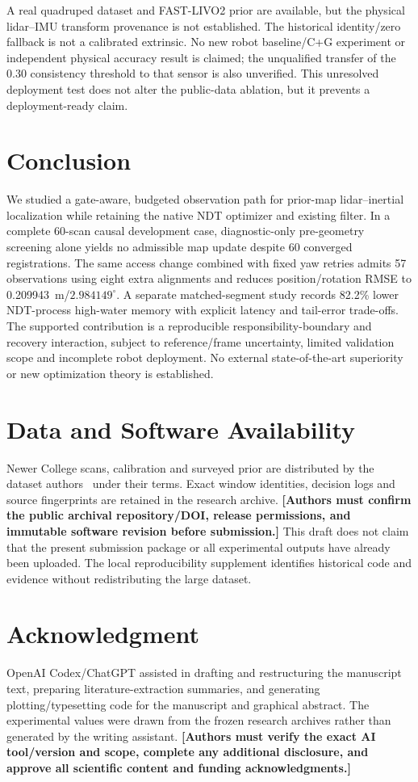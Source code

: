 \documentclass[journal,10pt,letterpaper]{IEEEtran}
\newcommand{\placeholder}[1]{\textbf{[#1]}}
\begin{document}
A real quadruped dataset and FAST-LIVO2 prior are available, but the physical lidar--IMU transform provenance is not established. The historical identity/zero fallback is not a calibrated extrinsic. No new robot baseline/C+G experiment or independent physical accuracy result is claimed; the unqualified transfer of the 0.30 consistency threshold to that sensor is also unverified. This unresolved deployment test does not alter the public-data ablation, but it prevents a deployment-ready claim.

\section{Conclusion}
We studied a gate-aware, budgeted observation path for prior-map lidar--inertial localization while retaining the native NDT optimizer and existing filter. In a complete 60-scan causal development case, diagnostic-only pre-geometry screening alone yields no admissible map update despite 60 converged registrations. The same access change combined with fixed yaw retries admits 57 observations using eight extra alignments and reduces position/rotation RMSE to 0.209943~m/$2.984149^\circ$. A separate matched-segment study records 82.2\% lower NDT-process high-water memory with explicit latency and tail-error trade-offs. The supported contribution is a reproducible responsibility-boundary and recovery interaction, subject to reference/frame uncertainty, limited validation scope and incomplete robot deployment. No external state-of-the-art superiority or new optimization theory is established.

\section*{Data and Software Availability}
Newer College scans, calibration and surveyed prior are distributed by the dataset authors~\cite{newer,ncindex,ncref} under their terms. Exact window identities, decision logs and source fingerprints are retained in the research archive. \placeholder{Authors must confirm the public archival repository/DOI, release permissions, and immutable software revision before submission.} This draft does not claim that the present submission package or all experimental outputs have already been uploaded. The local reproducibility supplement identifies historical code and evidence without redistributing the large dataset.

\section*{Acknowledgment}
OpenAI Codex/ChatGPT assisted in drafting and restructuring the manuscript text, preparing literature-extraction summaries, and generating plotting/typesetting code for the manuscript and graphical abstract. The experimental values were drawn from the frozen research archives rather than generated by the writing assistant. \placeholder{Authors must verify the exact AI tool/version and scope, complete any additional disclosure, and approve all scientific content and funding acknowledgments.}



\end{document}
